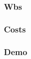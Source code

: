 \documentclass[12pt]{beamer}
\begin{document}
\begin{frame}[plain]
  \frametitle{Wbs}
\end{frame}

\begin{frame}[plain]
  \frametitle{Costs}
\end{frame}

\begin{frame}[plain]
  \frametitle{Demo}
\end{frame}
\end{document}
